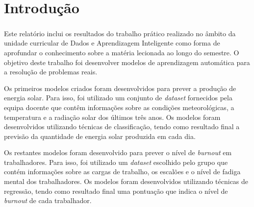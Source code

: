 \chapter{Introdução}
\paragraph{}
Este relatório inclui os resultados do trabalho prático realizado no âmbito da unidade curricular de Dados e Aprendizagem Inteligente como forma de aprofundar o conhecimento sobre a matéria lecionada ao longo do semestre. O objetivo deste trabalho foi desenvolver modelos de aprendizagem automática para a resolução de problemas reais.

Os primeiros modelos criados foram desenvolvidos para prever a produção de energia solar. Para isso, foi utilizado um conjunto de \textit{dataset} fornecidos pela equipa docente que contêm informações sobre as condições meteorológicas, a temperatura e a radiação solar dos últimos três anos. Os modelos foram desenvolvidos utilizando técnicas de classificação, tendo como resultado final a previsão da quantidade de energia solar produzida em cada dia.

Os restantes modelos foram desenvolvido para prever o nível de \textit{burnout} em trabalhadores. Para isso, foi utilizado um \textit{dataset} escolhido pelo grupo que contém informações sobre as cargas de trabalho, os escalões e o nível de fadiga mental dos trabalhadores. Os modelos foram desenvolvidos utilizando técnicas de regressão, tendo como resultado final uma pontuação que indica o nível de \textit{burnout} de cada trabalhador.
